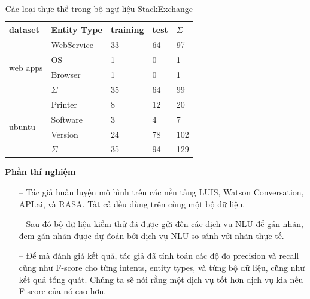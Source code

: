 \begin{table}[]
\begin{center}
\begin{tabular}{|l|l|l|l|l|}
\hline
dataset                                         & Entity Type & \textbf{training} & \textbf{test} & $\Sigma$   \\ \hline
\multicolumn{1}{|r|}{\multirow{4}{*}{web apps}} & WebService  & 33                & 64            & 97  \\ \cline{2-5} 
\multicolumn{1}{|r|}{}                          & OS          & 1                 & 0             & 1   \\ \cline{2-5} 
\multicolumn{1}{|r|}{}                          & Browser     & 1                 & 0             & 1   \\ \cline{2-5} 
\multicolumn{1}{|r|}{}                          & $\Sigma$          & 35                & 64            & 99  \\ \hline
\multirow{4}{*}{ubuntu}                         & Printer     & 8                 & 12            & 20  \\ \cline{2-5} 
                                                & Software    & 3                 & 4             & 7   \\ \cline{2-5} 
                                                & Version     & 24                & 78            & 102 \\ \cline{2-5} 
                                                & $\Sigma$           & 35                & 94            & 129 \\ \hline
\end{tabular}
\caption{Các loại thực thể trong bộ ngữ liệu StackExchange}
    \label{fig:comparisonimg-entityTypesStackExchange}
    \end{center}
\end{table}


\textbf{Phần thí nghiệm}

\begin{itemize}
    \item[--] Tác giả huấn luyện mô hình trên các nền tảng LUIS, Watson Conversation, API.ai, và RASA. Tất cả đều dùng trên cùng một bộ dữ liệu.
        \item[--]Sau đó bộ dữ liệu kiểm thử đã được gửi đến các dịch vụ NLU để gán nhãn, đem gán nhãn được dự đoán bởi dịch vụ NLU so sánh với nhãn thực tế.
        \item[--]Để mà đánh giá kết quả, tác giả đã tính toán các độ đo precision và recall cũng như F-score cho từng intents, entity types, và từng bộ dữ liệu, cũng như kết quả tổng quát. Chúng ta sẽ nói rằng một dịch vụ tốt hơn dịch vụ kia nếu F-score của nó cao hơn.
\end{itemize}

